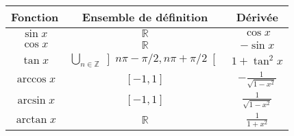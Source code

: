 \documentclass[11pt, addpoints, answers]{exam}
\begin{document}
\renewcommand\arraystretch{3.5}
\begin{table}[H]
\begin{center}
\begin{tabular}{|c|c|c|}
\hline
Fonction & Ensemble de définition& Dérivée \\
\hline\hline
$\sin x$ &$\mathbb{R}$& $\cos x$ \\
\hline
$\cos x$ &$\mathbb{R}$& $-\sin x$ \\
\hline
$\tan x$ &$\bigcup_{n\in\mathbb{Z}}\left]n\pi-\pi/2, n\pi+\pi/2\right[$ & $1+\tan^2 x$ \\
\hline
$\arccos x$ &$[-1,1]$& $-\frac{1}{\sqrt{1-x^2}}$ \\
\hline
$\arcsin x$ &$[-1,1]$& $\frac{1}{\sqrt{1-x^2}}$\\
\hline
$\arctan x$ &$\mathbb{R}$& $\frac{1}{1+x^2}$ \\
\hline
\end{tabular}
\end{center}
\end{table}%
\end{document}
